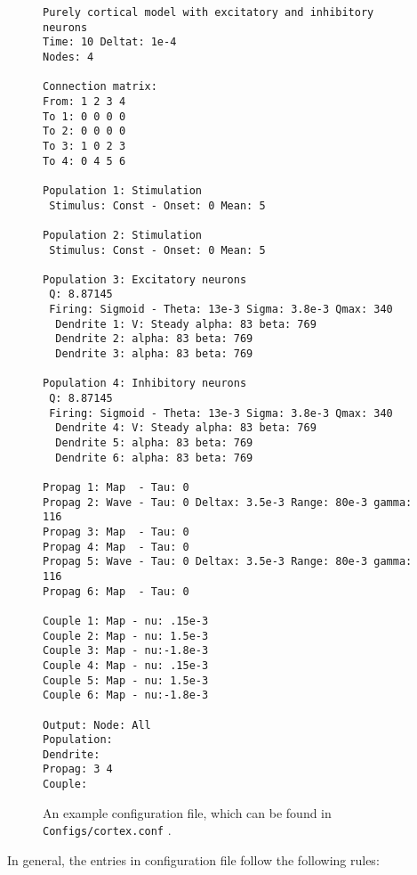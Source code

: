 \documentclass[12pt,a4paper]{article}
\newcommand{\type}[1]{ {\small\small\tt #1} }
\begin{document}
\begin{figure}\begin{center}
	\begin{lstlisting}
Purely cortical model with excitatory and inhibitory neurons
Time: 10 Deltat: 1e-4
Nodes: 4

Connection matrix:
From: 1 2 3 4
To 1: 0 0 0 0
To 2: 0 0 0 0
To 3: 1 0 2 3
To 4: 0 4 5 6

Population 1: Stimulation
 Stimulus: Const - Onset: 0 Mean: 5

Population 2: Stimulation
 Stimulus: Const - Onset: 0 Mean: 5

Population 3: Excitatory neurons
 Q: 8.87145
 Firing: Sigmoid - Theta: 13e-3 Sigma: 3.8e-3 Qmax: 340
  Dendrite 1: V: Steady alpha: 83 beta: 769
  Dendrite 2: alpha: 83 beta: 769
  Dendrite 3: alpha: 83 beta: 769

Population 4: Inhibitory neurons
 Q: 8.87145
 Firing: Sigmoid - Theta: 13e-3 Sigma: 3.8e-3 Qmax: 340
  Dendrite 4: V: Steady alpha: 83 beta: 769
  Dendrite 5: alpha: 83 beta: 769
  Dendrite 6: alpha: 83 beta: 769

Propag 1: Map  - Tau: 0
Propag 2: Wave - Tau: 0 Deltax: 3.5e-3 Range: 80e-3 gamma: 116
Propag 3: Map  - Tau: 0
Propag 4: Map  - Tau: 0
Propag 5: Wave - Tau: 0 Deltax: 3.5e-3 Range: 80e-3 gamma: 116
Propag 6: Map  - Tau: 0

Couple 1: Map - nu: .15e-3
Couple 2: Map - nu: 1.5e-3
Couple 3: Map - nu:-1.8e-3
Couple 4: Map - nu: .15e-3
Couple 5: Map - nu: 1.5e-3
Couple 6: Map - nu:-1.8e-3

Output: Node: All
Population: 
Dendrite:
Propag: 3 4
Couple:
	\end{lstlisting}
\end{center}
\caption{An example configuration file, which can be found in \type{Configs/cortex.conf}.}
\end{figure}

In general, the entries in configuration file follow the following rules:
\end{document}

